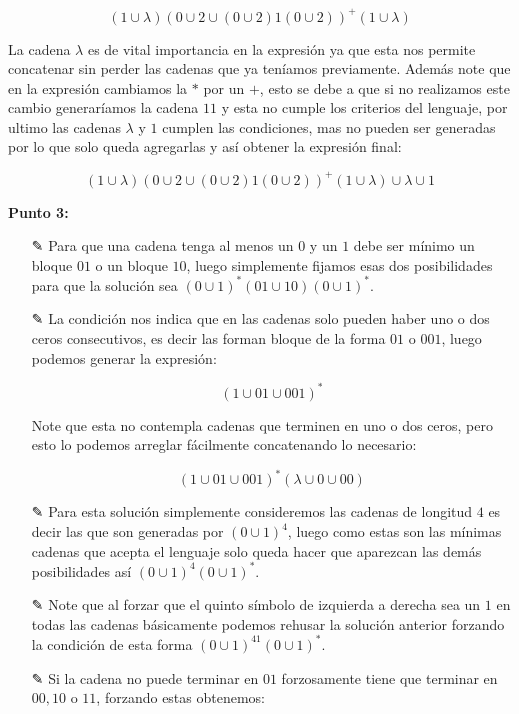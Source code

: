 \begin{itemize}
    $$(1\cup\lambda)(0\cup2\cup(0\cup2)1(0\cup2))^+(1\cup\lambda)$$

    La cadena $\lambda$ es de vital importancia en la expresión ya que esta nos permite concatenar sin perder las cadenas que ya teníamos previamente. Además note que en la expresión cambiamos la $*$ por un $+$, esto se debe a que si no realizamos este cambio generaríamos la cadena $11$ y esta no cumple los criterios del lenguaje, por ultimo las cadenas $\lambda$ y $1$ cumplen las condiciones, mas no pueden ser generadas por lo que solo queda agregarlas y así obtener la expresión final:

    $$(1\cup\lambda)(0\cup2\cup(0\cup2)1(0\cup2))^+(1\cup\lambda)\cup\lambda\cup1$$
\end{itemize}

\textbf{Punto 3:} \begin{itemize}
    \item[✎] Para que una cadena tenga al menos un $0$ y un $1$ debe ser mínimo un bloque $01$ o un bloque $10$, luego simplemente fijamos esas dos posibilidades para que la solución sea  $(0\cup1)^*(01\cup10)(0\cup1)^*$.

    \item[✎]La condición nos indica que en las cadenas solo pueden haber uno o dos ceros consecutivos, es decir las forman bloque de la forma $01$ o $001$, luego podemos generar la expresión:

    $$(1\cup01\cup001)^*$$

    Note que esta  no contempla cadenas que terminen en uno o dos ceros, pero esto lo podemos arreglar fácilmente concatenando lo necesario:

    $$(1\cup01\cup001)^*(\lambda\cup0\cup00)$$

    \item[✎]Para esta solución simplemente consideremos las cadenas de longitud $4$ es decir las que son generadas por $(0\cup1)^4$, luego como estas son las mínimas cadenas que acepta el lenguaje solo queda hacer que aparezcan las demás posibilidades así $(0\cup1)^4(0\cup1)^*$.

    \item[✎]Note que al forzar que el quinto símbolo de izquierda a derecha sea un $1$ en todas las cadenas básicamente podemos rehusar la solución anterior forzando la condición de esta forma $(0\cup1)^41(0\cup1)^*$.

    \item[✎]Si la cadena no puede terminar en $01$ forzosamente tiene que terminar en $00,10$ o $11$, forzando estas obtenemos:


\end{itemize}
